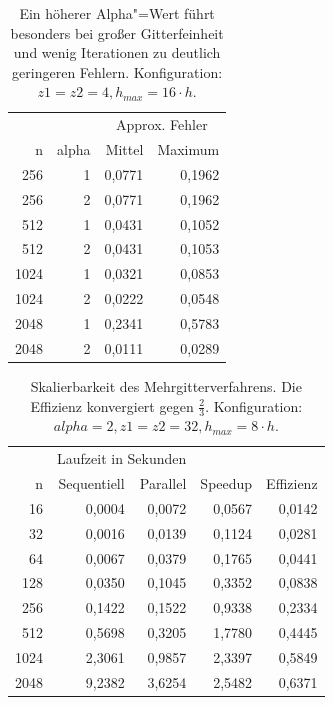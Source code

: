 \documentclass{beamer}
\begin{document}
\begin{table}
    \centering
    \begin{tabular}{|r|r|r|r|} \hline
    & & \multicolumn{2}{c|}{Approx. Fehler} \\
    n    & alpha & Mittel & Maximum \\ \hline \hline
    256  & 1     & 0,0771 & 0,1962  \\
    256  & 2     & 0,0771 & 0,1962  \\
    512  & 1     & 0,0431 & 0,1052  \\
    512  & 2     & 0,0431 & 0,1053  \\
    1024 & 1     & 0,0321 & 0,0853  \\
    1024 & 2     & 0,0222 & 0,0548  \\
    2048 & 1     & 0,2341 & 0,5783  \\
    2048 & 2     & 0,0111 & 0,0289  \\ \hline
    \end{tabular}
    \caption{Ein höherer Alpha"=Wert führt besonders bei großer Gitterfeinheit und wenig Iterationen zu deutlich geringeren Fehlern. Konfiguration: \(z1=z2=4, h_{max} = 16 \cdot h\).}
    \label{tab:c}
\end{table}

\begin{table}
    \centering
    \begin{tabular}{|r|r|r|r|r|} \hline
    & \multicolumn{2}{c|}{Laufzeit in Sekunden} & & \\
    n    & Sequentiell & Parallel & Speedup & Effizienz \\ \hline \hline
    16   & 0,0004      & 0,0072   & 0,0567  & 0,0142    \\
    32   & 0,0016      & 0,0139   & 0,1124  & 0,0281    \\
    64   & 0,0067      & 0,0379   & 0,1765  & 0,0441    \\
    128  & 0,0350      & 0,1045   & 0,3352  & 0,0838    \\
    256  & 0,1422      & 0,1522   & 0,9338  & 0,2334    \\
    512  & 0,5698      & 0,3205   & 1,7780  & 0,4445    \\
    1024 & 2,3061      & 0,9857   & 2,3397  & 0,5849    \\
    2048 & 9,2382      & 3,6254   & 2,5482  & 0,6371    \\ \hline
    \end{tabular}
    \caption{Skalierbarkeit des Mehrgitterverfahrens. Die Effizienz konvergiert gegen \(\frac{2}{3}\). Konfiguration: \(alpha=2, z1=z2=32, h_{max} = 8 \cdot h\).}
    \label{tab:e}
\end{table}
\end{document}
